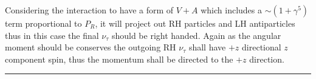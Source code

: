 \begin{solution}
\begin{enumerate}[label=(\roman*)]
        \begin{center}
        \end{center}\vspace{0.1in}
        
        Considering the interaction to have a form of $V+A$ which includes a $\sim (1+\gamma^5)$ term proportional to $P_R$, it will project out RH particles and LH antiparticles thus in this case the final $\nu_\tau$ should be right handed. Again as the angular moment should be conserves the outgoing RH $\nu_\tau$ shall have $+z$ directional $z$ component spin, thus the momentum shall be directed to the $+z$ direction.
    \end{enumerate}
\end{solution}

\noindent\rule{7in}{1.5pt}


